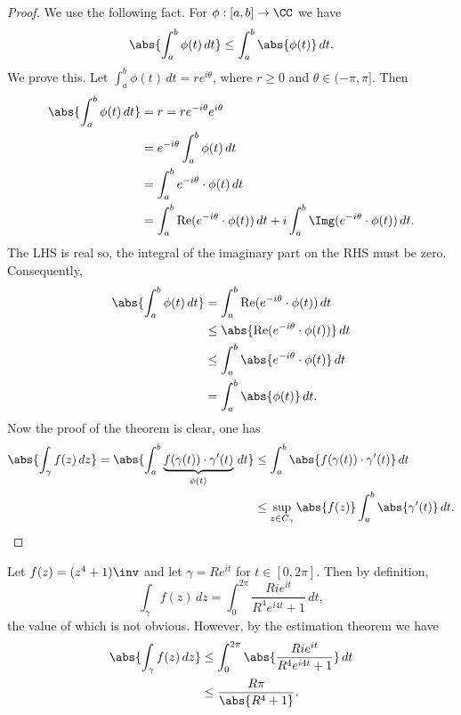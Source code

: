 \documentclass[12pt, a4paper]{article}
\DeclareMathOperator{\R}{Re}
\begin{document}
\begin{proof}
    We use the following fact. For \(\phi:[a,b] \to \CC\) we have 
    \[\abs{\int_a^b \phi(t) \, dt} \leq \int_a^b \abs{\phi(t)} \, dt.\]
    We prove this. Let \(\int_a^b \phi(t) \, dt = re^{i\theta}\), where \(r\geq 0\) and \(\theta \in (-\pi,\pi]\). Then 
    \[\begin{aligned}
        \abs{\int_a^b \phi(t) \, dt} &= r = r e^{-i\theta}e^{i\theta} \\
        &= e^{-i\theta} \int_a^b \phi(t) \, dt \\
        &= \int_a^b e^{-i\theta} \cdot \phi(t) \, dt \\
        &= \int_{a}^{b} \R(e^{-i\theta} \cdot \phi(t)) \, dt + i \int_a^b \Img(e^{-i\theta} \cdot \phi(t)) \, dt.
    \end{aligned}\]
    The LHS is real so, the integral of the imaginary part on the RHS must be zero. Consequently,
    \[\begin{aligned}
        \abs{\int_a^b \phi(t) \, dt} &= \int_a^b \R(e^{-i\theta} \cdot \phi(t)) \, dt \\
        &\leq \abs{\R(e^{-i\theta} \cdot \phi(t))} \, dt \\
        &\leq \int_a^b \abs{e^{-i\theta} \cdot \phi(t)} \, dt \\
        &= \int_a^b \abs{\phi(t)} \, dt.
    \end{aligned}\]
    Now the proof of the theorem is clear, one has 
    \[\begin{aligned}
        \abs{\int_{\gamma} f(z) \, dz} = \abs{\int_a^b \underbrace{f(\gamma(t)) \cdot \gamma'(t)}_{\phi(t)} \, dt}  &\leq \int_a^b \abs{f(\gamma(t)) \cdot \gamma'(t)} \, dt \\
        &\leq \sup_{z \in C_{\gamma}}\abs{f(z)} \int_a^b \abs{\gamma'(t)}\, dt.
    \end{aligned}\]
\end{proof}

\begin{mdexample}
    Let \(f(z)=(z^4+1)\inv\) and let \(\gamma = Re^{it}\) for \(t \in [0,2\pi]\). Then by definition,
    \[\int_{\gamma} f(z) \, dz = \int_0^{2\pi} \frac{Rie^{it}}{R^4e^{i4t}+1} \, dt,\]
    the value of which is not obvious. However, by the estimation theorem we have
    \[\begin{aligned}
       \abs{\int_{\gamma} f(z) \, dz} &\leq \int_{0}^{2\pi} \abs{\frac{Rie^{it}}{R^4e^{i4t}+1}} \, dt \\
       &\leq \frac{R\pi}{\abs{R^4+1}}.
    \end{aligned}\]
\end{mdexample}
\end{document}
